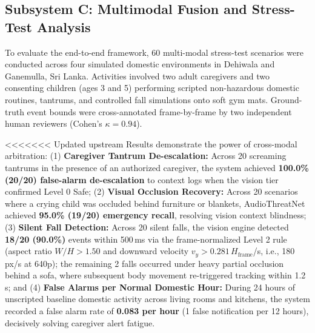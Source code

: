 \documentclass[conference]{IEEEtran}
\begin{document}
\subsection{Subsystem C: Multimodal Fusion and Stress-Test Analysis}
To evaluate the end-to-end framework, 60 multi-modal stress-test scenarios were conducted across four simulated domestic environments in Dehiwala and Ganemulla, Sri Lanka. Activities involved two adult caregivers and two consenting children (ages 3 and 5) performing scripted non-hazardous domestic routines, tantrums, and controlled fall simulations onto soft gym mats. Ground-truth event bounds were cross-annotated frame-by-frame by two independent human reviewers (Cohen's $\kappa = 0.94$).

<<<<<<< Updated upstream
Results demonstrate the power of cross-modal arbitration: (1) \textbf{Caregiver Tantrum De-escalation:} Across 20 screaming tantrums in the presence of an authorized caregiver, the system achieved \textbf{100.0\% (20/20) false-alarm de-escalation} to context logs when the vision tier confirmed Level 0 Safe; (2) \textbf{Visual Occlusion Recovery:} Across 20 scenarios where a crying child was occluded behind furniture or blankets, AudioThreatNet achieved \textbf{95.0\% (19/20) emergency recall}, resolving vision context blindness; (3) \textbf{Silent Fall Detection:} Across 20 silent falls, the vision engine detected \textbf{18/20 (90.0\%)} events within 500\,ms via the frame-normalized Level 2 rule (aspect ratio $W/H > 1.50$ and downward velocity $v_y > 0.281\,H_{\text{frame}}$/s, i.e., 180\,px/s at 640p); the remaining 2 falls occurred under heavy partial occlusion behind a sofa, where subsequent body movement re-triggered tracking within 1.2\,s; and (4) \textbf{False Alarms per Normal Domestic Hour:} During 24 hours of unscripted baseline domestic activity across living rooms and kitchens, the system recorded a false alarm rate of \textbf{0.083 per hour} (1 false notification per 12 hours), decisively solving caregiver alert fatigue.
\end{document}
